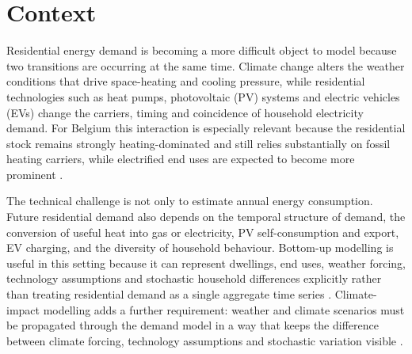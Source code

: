 \label{ch:introduction}


\section{Context}

Residential energy demand is becoming a more difficult object to model because two transitions are occurring at the same time. Climate change alters the weather conditions that drive space-heating and cooling pressure, while residential technologies such as heat pumps, photovoltaic (PV) systems and electric vehicles (EVs) change the carriers, timing and coincidence of household electricity demand. For Belgium this interaction is especially relevant because the residential stock remains strongly heating-dominated and still relies substantially on fossil heating carriers, while electrified end uses are expected to become more prominent \cite{eurostat_disaggregated_nodate,JRC2022HeatPumpBelgium,Statbel2025EV}.

The technical challenge is not only to estimate annual energy consumption. Future residential demand also depends on the temporal structure of demand, the conversion of useful heat into gas or electricity, PV self-consumption and export, EV charging, and the diversity of household behaviour. Bottom-up modelling is useful in this setting because it can represent dwellings, end uses, weather forcing, technology assumptions and stochastic household differences explicitly rather than treating residential demand as a single aggregate time series \cite{Richardson2010CRESTElectricity,McKenna2015}. Climate-impact modelling adds a further requirement: weather and climate scenarios must be propagated through the demand model in a way that keeps the difference between climate forcing, technology assumptions and stochastic variation visible \cite{IPCC2021,DeWilde2014,Jacob2014EuroCordex}.

